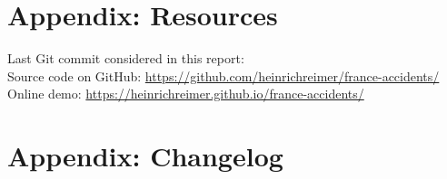 \section*{Appendix: Resources}
Last Git commit considered in this report: \href{https://github.com/heinrichreimer/france-accidents/commits/}{\texttt{\lastcommit}} \\
Source code on GitHub: \url{https://github.com/heinrichreimer/france-accidents/} \\
Online demo: \url{https://heinrichreimer.github.io/france-accidents/}

\section*{Appendix: Changelog}

